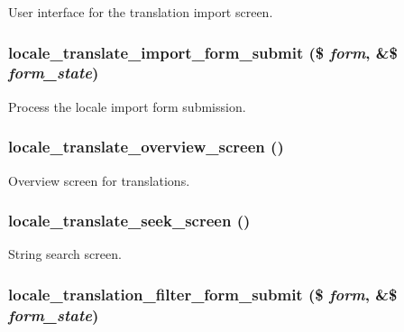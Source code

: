 \label{group__locale_gaceb2c6612ad9bc1472e4d3c71618c9b3}
User interface for the translation import screen. \hypertarget{group__locale_gab96d979ef16a3468061ebb7e11e3210e}{
\subsubsection[{locale\_\-translate\_\-import\_\-form\_\-submit}]{\setlength{\rightskip}{0pt plus 5cm}locale\_\-translate\_\-import\_\-form\_\-submit (\$ {\em form}, \/  \&\$ {\em form\_\-state})}}
\label{group__locale_gab96d979ef16a3468061ebb7e11e3210e}
Process the locale import form submission. \hypertarget{group__locale_gac36ea050ad5c0a75624c1a9b63c343a0}{
\subsubsection[{locale\_\-translate\_\-overview\_\-screen}]{\setlength{\rightskip}{0pt plus 5cm}locale\_\-translate\_\-overview\_\-screen ()}}
\label{group__locale_gac36ea050ad5c0a75624c1a9b63c343a0}
Overview screen for translations. \hypertarget{group__locale_gaa34fbb14f95e9ae562772895b284d170}{
\subsubsection[{locale\_\-translate\_\-seek\_\-screen}]{\setlength{\rightskip}{0pt plus 5cm}locale\_\-translate\_\-seek\_\-screen ()}}
\label{group__locale_gaa34fbb14f95e9ae562772895b284d170}
String search screen. \hypertarget{group__locale_gac578de2fae636045173446f2aa26bd0f}{
\subsubsection[{locale\_\-translation\_\-filter\_\-form\_\-submit}]{\setlength{\rightskip}{0pt plus 5cm}locale\_\-translation\_\-filter\_\-form\_\-submit (\$ {\em form}, \/  \&\$ {\em form\_\-state})}}

